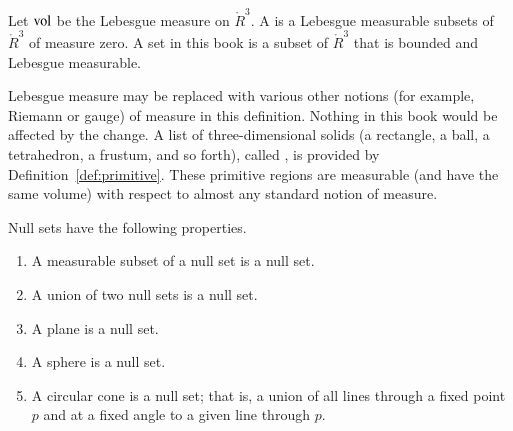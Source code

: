 
\begin{definition}
Let ${\operatorname{vol}}$ be the Lebesgue measure
on $\ring{R}^3$. 
A  is a 
Lebesgue measurable subsets of $\ring{R}^3$ of measure zero.
A  set in this book is a subset of $\ring{R}^3$ that
is bounded and Lebesgue measurable.
\end{definition}
%
%

\begin{remark}[]
Lebesgue measure may
  be replaced with various other notions (for example, Riemann or gauge) of measure in this definition.  Nothing in this book would be affected by the change.
A list of three-dimensional solids  
(a rectangle, a ball, a tetrahedron, a frustum, and so forth),
called , is provided by Definition~\ref{def:primitive}.  These
primitive regions are measurable (and have the same volume) 
with respect to almost any standard notion
of measure.  
\end{remark}

\begin{lemma}\label{lemma:null}
Null sets have the following properties.
\begin{enumerate}%
\item A measurable subset of a null set is a null set.
\item A union of two null sets is a null set.
\item A plane is a null set.
\item A sphere is a null set.
\item A circular cone is a null set; that is, a union of all
lines through a fixed point $p$ and at
a fixed angle to a given line through $p$.
\label{enum:null}
%
%
%
%
\end{enumerate}
\end{lemma}
%

%



